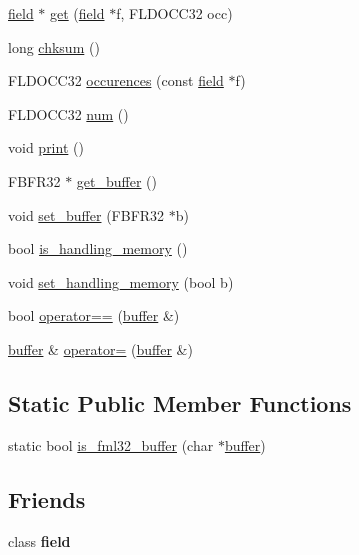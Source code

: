 \begin{DoxyCompactItemize}
\item 
\hyperlink{classatmi_1_1field}{field} $\ast$ \hyperlink{classatmi_1_1buffer_a54d377f4ebed18539b4f14f9dbf3f215}{get} (\hyperlink{classatmi_1_1field}{field} $\ast$f, F\+L\+D\+O\+C\+C32 occ)
\item 
long \hyperlink{classatmi_1_1buffer_a4ae9fa419098eb136ae3681ad90ccafb}{chksum} ()
\item 
F\+L\+D\+O\+C\+C32 \hyperlink{classatmi_1_1buffer_abce3f6694ba1a8a9ea2b51cf52ec26e6}{occurences} (const \hyperlink{classatmi_1_1field}{field} $\ast$f)
\item 
F\+L\+D\+O\+C\+C32 \hyperlink{classatmi_1_1buffer_a3ec1c691a444915993628b2774503d18}{num} ()
\item 
void \hyperlink{classatmi_1_1buffer_a04d31b2fb8d27274ad81e8064eec3765}{print} ()
\item 
F\+B\+F\+R32 $\ast$ \hyperlink{classatmi_1_1buffer_aa9aa5382717ed17a2047db2779f8f0ec}{get\+\_\+buffer} ()
\item 
void \hyperlink{classatmi_1_1buffer_ade8853e7c2ae10dcd024b34049e99af3}{set\+\_\+buffer} (F\+B\+F\+R32 $\ast$b)
\item 
bool \hyperlink{classatmi_1_1buffer_aae543cf7816b338d20031993c18ce491}{is\+\_\+handling\+\_\+memory} ()
\item 
void \hyperlink{classatmi_1_1buffer_a68f05d1dbd040062850feeba5aa188fc}{set\+\_\+handling\+\_\+memory} (bool b)
\item 
bool \hyperlink{classatmi_1_1buffer_a580571a4a3cf75eafe90543e9ab07333}{operator==} (\hyperlink{classatmi_1_1buffer}{buffer} \&)
\item 
\hyperlink{classatmi_1_1buffer}{buffer} \& \hyperlink{classatmi_1_1buffer_a5cb08586cc2e633a3b0e80755dda53cd}{operator=} (\hyperlink{classatmi_1_1buffer}{buffer} \&)
\end{DoxyCompactItemize}
\subsection*{Static Public Member Functions}
\begin{DoxyCompactItemize}
\item 
static bool \hyperlink{classatmi_1_1buffer_a38aca9956db23474cb19d4c737b08262}{is\+\_\+fml32\+\_\+buffer} (char $\ast$\hyperlink{classatmi_1_1buffer}{buffer})
\end{DoxyCompactItemize}
\subsection*{Friends}
\begin{DoxyCompactItemize}
\item 
\hypertarget{classatmi_1_1buffer_acd53905ae10cba58b4337aefe648aec6}{}class {\bfseries field}\label{classatmi_1_1buffer_acd53905ae10cba58b4337aefe648aec6}

\end{DoxyCompactItemize}
